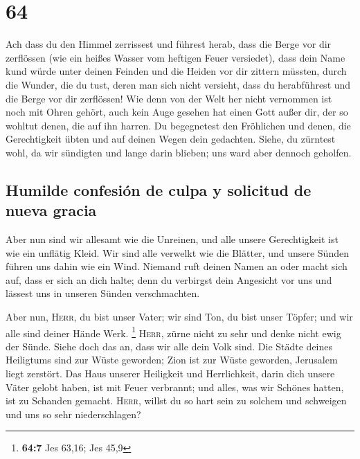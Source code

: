 \hypertarget{section-63}{%
\section{64}\label{section-63}}

 Ach dass du den Himmel zerrissest und führest herab, dass
die Berge vor dir zerflössen (wie ein heißes Wasser vom heftigen Feuer
versiedet), dass dein Name kund würde unter deinen Feinden und die
Heiden vor dir zittern müssten,  durch die Wunder, die du
tust, deren man sich nicht versieht, dass du herabführest und die Berge
vor dir zerflössen!  Wie denn von der Welt her nicht
vernommen ist noch mit Ohren gehört, auch kein Auge gesehen hat einen
Gott außer dir, der so wohltut denen, die auf ihn harren. 
Du begegnetest den Fröhlichen und denen, die Gerechtigkeit übten und auf
deinen Wegen dein gedachten. Siehe, du zürntest wohl, da wir sündigten
und lange darin blieben; uns ward aber dennoch geholfen.

\hypertarget{humilde-confesiuxf3n-de-culpa-y-solicitud-de-nueva-gracia}{%
\subsection{Humilde confesión de culpa y solicitud de nueva
gracia}\label{humilde-confesiuxf3n-de-culpa-y-solicitud-de-nueva-gracia}}

 Aber nun sind wir allesamt wie die Unreinen, und alle
unsere Gerechtigkeit ist wie ein unflätig Kleid. Wir sind alle verwelkt
wie die Blätter, und unsere Sünden führen uns dahin wie ein Wind.
 Niemand ruft deinen Namen an oder macht sich auf, dass er
sich an dich halte; denn du verbirgst dein Angesicht vor uns und lässest
uns in unseren Sünden verschmachten.

 Aber nun, \textsc{Herr}, du bist unser Vater; wir sind
Ton, du bist unser Töpfer; und wir alle sind deiner Hände Werk.
\footnote{\textbf{64:7} Jes 63,16; Jes 45,9} 
\textsc{Herr}, zürne nicht zu sehr und denke nicht ewig der Sünde. Siehe
doch das an, dass wir alle dein Volk sind.  Die Städte
deines Heiligtums sind zur Wüste geworden; Zion ist zur Wüste geworden,
Jerusalem liegt zerstört.  Das Haus unserer Heiligkeit
und Herrlichkeit, darin dich unsere Väter gelobt haben, ist mit Feuer
verbrannt; und alles, was wir Schönes hatten, ist zu Schanden gemacht.
 \textsc{Herr}, willst du so hart sein zu solchem und
schweigen und uns so sehr niederschlagen?

